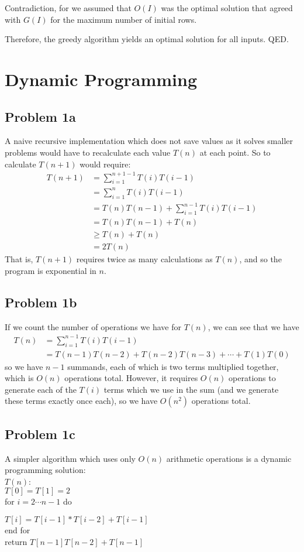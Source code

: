 \documentclass[12pt]{article}
\begin{document}
		Contradiction, for we assumed that $O(I)$ was the optimal solution that agreed with
				$G(I)$ for the maximum number of initial rows.
				
		Therefore, the greedy algorithm yields an optimal solution for all inputs. QED.
\section*{Dynamic Programming}
	\subsection*{Problem 1a}
		A naive recursive implementation which does not save values as it solves smaller problems would have to recalculate each value $T(n)$ at each point. So to calculate $T(n+1)$ would require:
		\begin{align*}
			T(n+1) &= \sum_{i=1}^{n+1-1}T(i)T(i-1)\\
				&= \sum_{i=1}^{n}T(i)T(i-1)\\
				&= T(n)T(n-1) + \sum_{i=1}^{n-1}T(i)T(i-1)\\
				&= T(n)T(n-1) + T(n)\\
				&\ge T(n) + T(n)\\
				&= 2T(n)
		\end{align*}
		That is, $T(n+1)$ requires twice as many calculations as $T(n)$, and so the program is exponential in $n$.
	
	\subsection*{Problem 1b}
		If we count the number of operations we have for $T(n)$, we can see that we have
		\begin{align*}
			T(n) &= \sum_{i=1}^{n-1}T(i)T(i-1)\\
				&= T(n-1)T(n-2) + T(n-2)T(n-3) + \cdots + T(1)T(0)
		\end{align*}
		so we have $n-1$ summands, each of which is two terms multiplied together, which is $O(n)$ operations total. However, it requires $O(n)$ operations to generate each of the $T(i)$ terms which we use in the sum (and we generate these terms exactly once each), so we have $O(n^2)$ operations total.
		
	\subsection*{Problem 1c}
		A simpler algorithm which uses only $O(n)$ arithmetic operations is a dynamic programming solution:\\
		$T(n)$:\\
		$T[0] = T[1] = 2$\\
		for $i = 2 \cdots n-1$ do
		
		$T[i] = T[i-1]*T[i-2] + T[i-1]$\\
		end for\\
		return $T[n-1]T[n-2] + T[n-1]$
		
		
\end{document}
